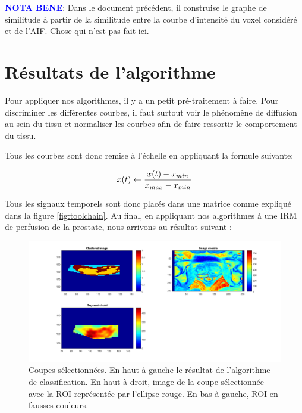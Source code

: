 \medskip

\textbf{\textcolor{blue}{ NOTA BENE}}: Dans le document précédent, il construise le graphe de similitude à partir de la similitude entre la courbe d'intensité du voxel considéré et de l'AIF. Chose qui n'est pas fait ici.


\section{Résultats de l'algorithme}

Pour appliquer nos algorithmes, il y a un petit pré-traitement à faire. Pour discriminer les différentes courbes, il faut surtout voir le phénomène de diffusion au sein du tissu et normaliser les courbes afin de faire ressortir le comportement du tissu.
\medskip

Tous les courbes sont donc remise à l'échelle en appliquant la formule suivante:

\begin{equation}
\centering
x(t) \gets \frac{x(t)-x_{min}}{x_{max}-x_{min}}
\end{equation} 

\medskip

Tous les signaux temporels sont donc placés dans une matrice comme expliqué dans la figure \ref{fig:toolchain}. 
Au final, en appliquant nos algorithmes à une IRM de perfusion de la prostate, nous arrivons au résultat suivant :

\begin{figure}[H]
\centering
    \includegraphics[scale=0.4,angle=0]{Images/3classProstate2.png}
    \caption{Coupes sélectionnées. En haut à gauche le résultat de l'algorithme de classification. En haut à droit, image de la coupe sélectionnée avec la ROI représentée par l'ellipse rouge. En bas à gauche, ROI en fausses couleurs.}
    \label{fig:3classProstate2}
\end{figure} 

